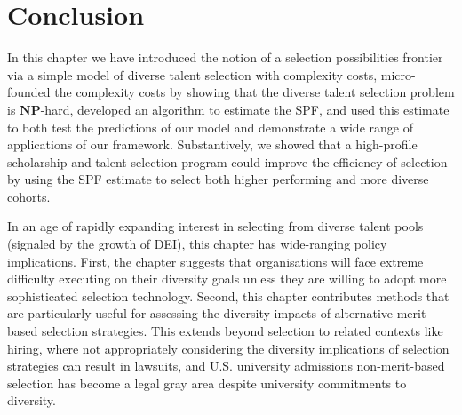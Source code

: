 

\section{Conclusion} \label{sec:conclusion}
In this chapter we have introduced the notion of a selection possibilities frontier via a simple model of diverse talent selection with complexity costs, micro-founded the complexity costs by showing that the diverse talent selection problem is $\mathbf{NP}$-hard, developed an algorithm to estimate the SPF, and used this estimate to both test the predictions of our model and demonstrate a wide range of applications of our framework. Substantively, we showed that a high-profile scholarship and talent selection program could improve the efficiency of selection by using the SPF estimate to select both higher performing and more diverse cohorts. 

In an age of rapidly expanding interest in selecting from diverse talent pools (signaled by the growth of DEI), this chapter has wide-ranging policy implications. First, the chapter suggests that organisations will face extreme difficulty executing on their diversity goals unless they are willing to adopt more sophisticated selection technology. Second, this chapter contributes methods that are particularly useful for assessing the diversity impacts of alternative merit-based selection strategies. This extends beyond selection to related contexts like hiring, where not appropriately considering the diversity implications of selection strategies can result in lawsuits, and U.S. university admissions non-merit-based selection has become a legal gray area despite university commitments to diversity. 



